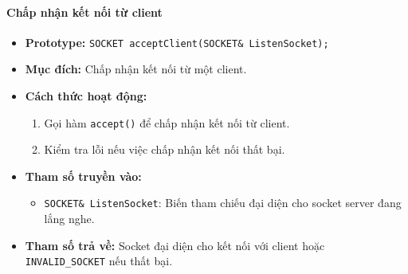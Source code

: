 \paragraph{\textbf{Chấp nhận kết nối từ client}}
\begin{itemize}
    \item \textbf{Prototype:} \texttt{SOCKET acceptClient(SOCKET\& ListenSocket);}
    
    \item \textbf{Mục đích:} Chấp nhận kết nối từ một client.
    
    \item \textbf{Cách thức hoạt động:} 
    \begin{enumerate}
        \item Gọi hàm \texttt{accept()} để chấp nhận kết nối từ client.
        \item Kiểm tra lỗi nếu việc chấp nhận kết nối thất bại.
    \end{enumerate}
    
    \item \textbf{Tham số truyền vào:} 
    \begin{itemize}
        \item \texttt{SOCKET\& ListenSocket}: Biến tham chiếu đại diện cho socket server đang lắng nghe.
    \end{itemize}
    
    \item \textbf{Tham số trả về:} Socket đại diện cho kết nối với client hoặc \texttt{INVALID\_SOCKET} nếu thất bại.
\end{itemize}

